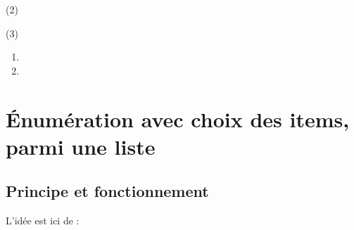 \documentclass[french,11pt,a4paper]{article}
\begin{document}
\begin{DemoCode}{}
\lipsum[1][1-2]

\begin{MultiCols}(2)
    \lipsum[2]
\end{MultiCols}

\lipsum[1][3-4]
\end{DemoCode}

\begin{DemoCode}{}
\lipsum[1][1-2]

\begin{MultiCols}[CoeffEspVert=0.25,EpTrait=1pt](3)
    \lipsum[2]
\end{MultiCols}

\lipsum[1][3-4]
\end{DemoCode}

\begin{DemoCode}{}
\begin{enumerate}
    \item \lipsum[1][1-2]
    \item \lipsum[1][3-4]
\end{enumerate}

\lipsum[3][1]
\end{DemoCode}

\pagebreak

\section{Énumération avec choix des items, parmi une liste}

\subsection{Principe et fonctionnement}

L'idée est ici de :
\end{document}
